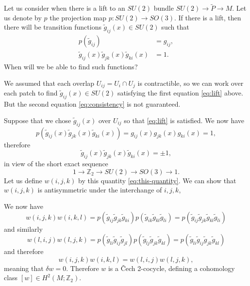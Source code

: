 \documentclass[12pt]{article}
\numberwithin{equation}{section}
\numberwithin{figure}{section}
\theoremstyle{remark}
\def\bZ{\mathbb{Z}}
\begin{document}
Let us consider when there is a lift to an $SU(2)$ bundle $SU(2)\to \tilde P\to M$.
Let us denote by $p$ the projection map $p:SU(2)\to SO(3)$.
If there is a lift, then there will be transition functions $\tilde g_{ij}(x)\in SU(2)$ such that \begin{align}
  p(\tilde g_{ij}) &= g_{ij}, \label{eq:lift}\\
  \tilde g_{ij}(x)\tilde g_{jk}(x)\tilde g_{ki}(x) &= 1.\label{eq:consistency}
\end{align}
When will we be able to find such functions?

We assumed that each overlap $U_{ij}=U_i\cap U_j$ is contractible, 
so we can work over each patch to find $\tilde g_{ij}(x)\in SU(2)$ satisfying 
the first equation \eqref{eq:lift} above.
But the second equation \eqref{eq:consistency} is not guaranteed. 

Suppose that we chose $\tilde g_{ij}(x)$ over $U_{ij}$ so that \eqref{eq:lift} is satisfied.
We now have \begin{equation}
p(\tilde g_{ij}(x)\tilde g_{jk}(x)\tilde g_{ki}(x)) = g_{ij}(x)g_{jk}(x)g_{ki}(x)=1,
\end{equation}
therefore \begin{equation}
\tilde g_{ij}(x)\tilde g_{jk}(x)\tilde g_{ki}(x) = \pm 1, \label{eq:this-quantity}
\end{equation} in view of the short exact sequence \begin{equation}
1\to \bZ_2 \to SU(2)\to SO(3)\to 1.
\end{equation}
Let us define $w(i,j,k)$ by this quantity \eqref{eq:this-quantity}.
We can show that $w(i,j,k)$ is antisymmetric under the interchange of $i,j,k$,

We now have \begin{equation}
w(i,j,k)w(i,k,l)= p(\tilde g_{ij} \tilde g_{jk}\tilde g_{ki} ) 
p(\tilde g_{ik} \tilde g_{kl} \tilde g_{li})
=p(\tilde g_{ij} \tilde g_{jk}\tilde g_{kl} \tilde g_{li})
\end{equation} and similarly \begin{equation}
  w(l,i,j)w(l,j,k)= p(\tilde g_{li} \tilde g_{ij}\tilde g_{jl} ) 
  p(\tilde g_{lj} \tilde g_{jk} \tilde g_{kl})
  =p(\tilde g_{li}\tilde g_{ij} \tilde g_{jk}\tilde g_{kl} )  
\end{equation} and therefore \begin{equation}
  w(i,j,k)w(i,k,l) = w(l,i,j)w(l,j,k),
\end{equation}  meaning that $\delta w=0$.
Therefore $w$ is a \v Cech 2-cocycle, defining a cohomology class $[w]\in H^2(M;\bZ_2)$.
\end{document}
